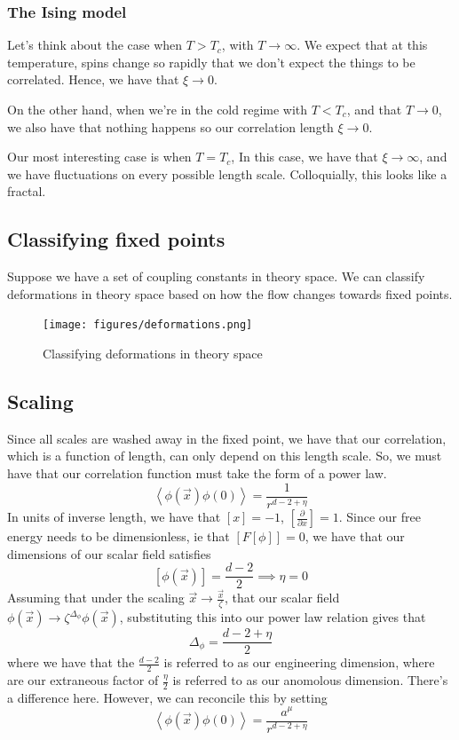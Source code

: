 \documentclass[11pt, oneside]{article}   	%
\begin{document}
\subsubsection{The Ising model} 
Let's think about the case when $ T > T_c$, with $ 
T \to \infty$. We expect that at this temperature, 
spins change so rapidly that we don't expect the things to 
be correlated. Hence, we have that $ \xi \to 0$. 

On the other hand, when we're in the cold regime
with  $ T < T_ c $, and that  $ T \to 0 $, we also 
have that nothing happens so our correlation length 
$ \xi \to 0 $. 

Our most interesting case is when  $ T = T_c $, 
In this case, we have that  $ \xi \to \infty$, 
and we have fluctuations on every possible length scale. 
Colloquially, this looks like a fractal. 

\subsection{Classifying fixed points} 
Suppose we have a set of coupling constants in theory space. 
We can classify deformations in theory 
space based on how the flow changes towards fixed points. 

\begin{figure}[h]
	\centering
	\texttt{[image: figures/deformations.png]}
	\caption{Classifying deformations in theory space}%
	\label{fig:deformations}
\end{figure}


\subsection{Scaling}
Since all scales are washed away in the fixed point, 
we have that our correlation, which is a function of length, 
can only depend on this length scale. So, we must have that 
our correlation function must take the form of a power law. 
\[
	\left< \phi ( \vec{x} ) \phi ( 0 )  \right> = \frac{1}{ r ^{ d - 2 + \eta }}
\] In units of inverse length, we have that 
$ [ x ]  = - 1$,  $ \left[ \frac{\partial }{\partial x }   \right]  = 1 $. 
Since our free energy needs to be dimensionless, 
ie that $ [ F [ \phi ] ]  = 0 $, we have that our dimensions 
of our scalar field satisfies \[
	[ \phi ( \vec{x} ) ] = \frac{d -2  }{ 2 } \implies \eta = 0 
\] Assuming that under the scaling $ \vec{x} \to \frac{\vec{x} }{ \zeta}$, 
that our scalar field $ \phi ( \vec{x} ) \to \zeta ^{ \Delta_{ \phi } } \phi ( \vec{x} ) $, 
substituting this into our power law relation gives that 
\[
 \Delta_\phi = \frac{d -2 + \eta }{ 2 } 
\]  where we have that the $ \frac{d - 2 }{ 2 } $ is referred to 
as our engineering dimension, where are our extraneous factor 
of $ \frac{\eta }{ 2 } $ is referred to as our anomolous dimension. 
There's a difference here. However, we can reconcile this by 
setting 
\[
	\left< \phi ( \vec{x} ) \phi  (0 )  \right>  = \frac{a ^ \mu }{ r ^{ d - 2 + \eta }}
\] 
\end{document}
